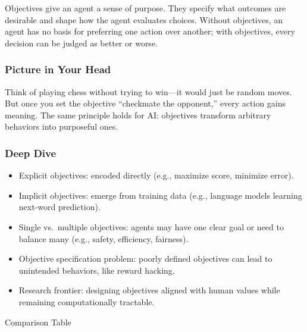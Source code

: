 \documentclass[
  letterpaper,
  DIV=11,
  numbers=noendperiod]{scrreprt}
\providecommand{\tightlist}{%
  \setlength{\itemsep}{0pt}\setlength{\parskip}{0pt}}
\begin{document}
Objectives give an agent a sense of purpose. They specify what outcomes
are desirable and shape how the agent evaluates choices. Without
objectives, an agent has no basis for preferring one action over
another; with objectives, every decision can be judged as better or
worse.

\subsubsection{Picture in Your Head}\label{picture-in-your-head-10}

Think of playing chess without trying to win---it would just be random
moves. But once you set the objective ``checkmate the opponent,'' every
action gains meaning. The same principle holds for AI: objectives
transform arbitrary behaviors into purposeful ones.

\subsubsection{Deep Dive}\label{deep-dive-10}

\begin{itemize}
\tightlist
\item
  Explicit objectives: encoded directly (e.g., maximize score, minimize
  error).
\item
  Implicit objectives: emerge from training data (e.g., language models
  learning next-word prediction).
\item
  Single vs.~multiple objectives: agents may have one clear goal or need
  to balance many (e.g., safety, efficiency, fairness).
\item
  Objective specification problem: poorly defined objectives can lead to
  unintended behaviors, like reward hacking.
\item
  Research frontier: designing objectives aligned with human values
  while remaining computationally tractable.
\end{itemize}

Comparison Table
\end{document}
